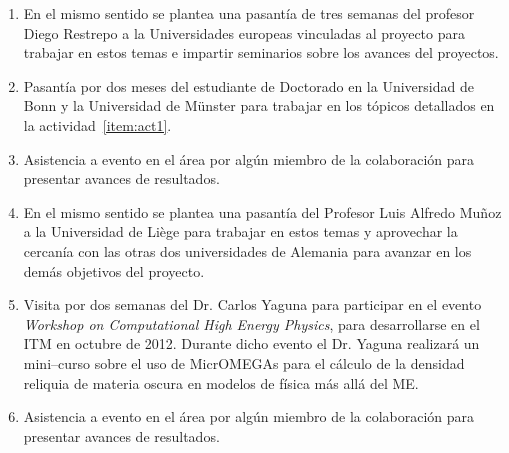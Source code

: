 \begin{enumerate}
\item En el mismo sentido se plantea una pasantía de tres semanas del
  profesor Diego Restrepo a la Universidades europeas vinculadas al
  proyecto para trabajar en estos temas e impartir seminarios sobre
  los avances del proyectos. 
  \label{item:act5}

\item Pasantía por dos meses del estudiante de Doctorado en la
  Universidad de Bonn y la Universidad de Münster para trabajar en
  los tópicos detallados en la actividad~\ref{item:act1}.
  \label{item:act6}
\item Asistencia a evento en el área por algún miembro de la
  colaboración para presentar avances de resultados.

\item En el mismo sentido se plantea una pasantía del Profesor Luis
  Alfredo Muñoz a la Universidad de Liège para trabajar en estos temas y
  aprovechar la cercanía con las otras dos universidades de Alemania
  para avanzar en los demás objetivos del proyecto.
  \label{item:act8}
\item Visita por dos semanas del Dr. Carlos Yaguna para participar en
  el evento \emph{Workshop on Computational High Energy Physics}, para
  desarrollarse en el ITM en octubre de 2012. Durante dicho evento el
  Dr. Yaguna realizará un mini--curso sobre el uso de MicrOMEGAs para
  el cálculo de la densidad reliquia de materia oscura en modelos de física
  más allá del ME.
  \label{item:act9}
\item Asistencia a evento en el área por algún miembro de la
  colaboración para presentar avances de resultados.
\end{enumerate}




